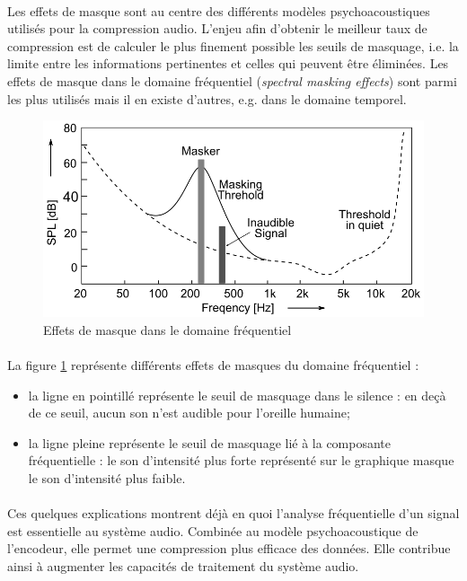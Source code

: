 \documentclass{article}
\begin{document}
    \paragraph{}
    Les effets de masque sont au centre des différents modèles psychoacoustiques utilisés pour la compression audio. L'enjeu afin d'obtenir le meilleur taux de compression est de calculer le plus finement possible les seuils de masquage, i.e. la limite entre les informations pertinentes et celles qui peuvent être éliminées. Les effets de masque dans le domaine fréquentiel (\emph{spectral masking effects}) sont parmi les plus utilisés mais il en existe d'autres, e.g. dans le domaine temporel.
    \begin{figure}[H]
        \centering
        \includegraphics[width=.6\linewidth]{./images/2019-Herre-Dick-masking-effect.png}
        \caption{Effets de masque dans le domaine fréquentiel}
        \label{fig:freq_masking}
    \end{figure}

    \paragraph{}
    La figure \ref{fig:freq_masking} représente différents effets de masques du domaine fréquentiel :
    \begin{itemize}
        \item la ligne en pointillé représente le seuil de masquage dans le silence : en deçà de ce seuil, aucun son n'est audible pour l'oreille humaine\cite{1924-wegel};
        \item la ligne pleine représente le seuil de masquage lié à la composante fréquentielle : le son d'intensité plus forte représenté sur le graphique masque le son d'intensité plus faible\cite{1974-Vogten}.
    \end{itemize}

    \paragraph{}
    Ces quelques explications montrent déjà en quoi l'analyse fréquentielle d'un signal est essentielle au système audio. Combinée au modèle psychoacoustique de l'encodeur, elle permet une compression plus efficace des données. Elle contribue ainsi à augmenter les capacités de traitement du système audio.
\end{document}
